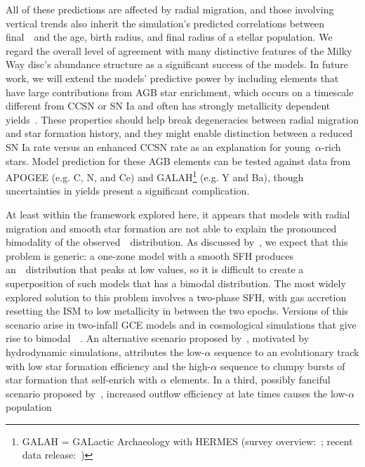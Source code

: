 All of these predictions are affected by radial migration, and those involving 
vertical trends also inherit the simulation's predicted correlations between 
final~\absz~and the age, birth radius, and final radius of a stellar 
population. 
We regard the overall level of agreement with many distinctive features of the 
Milky Way disc's abundance structure as a significant success of the models. 
In future work, we will extend the models' predictive power by including 
elements that have large contributions from AGB star enrichment, which occurs 
on a timescale different from CCSN or SN Ia and often has strongly 
metallicity dependent yields~\citep[e.g.][]{Cristallo2011, Cristallo2015}. 
These properties should help break degeneracies between radial migration and 
star formation history, and they might enable distinction between a reduced 
SN Ia rate versus an enhanced CCSN rate as an explanation for 
young~$\alpha$-rich stars. 
Model prediction for these AGB elements can be tested against data from 
APOGEE (e.g. C, N, and Ce) and GALAH\footnote{
	GALAH = GALactic Archaeology with HERMES 
	(survey overview:~\citealp{Martell2017}; 
	recent data release:~\citealp{Buder2021}) 
} (e.g. Y and Ba), though uncertainties in yields present a significant 
complication.
\par 
At least within the framework explored here, it appears that models 
with radial migration and smooth star formation are not able to explain the 
pronounced bimodality of the observed~\afe~distribution. 
As discussed by~\citet{Vincenzo2021a}, we expect that this problem is generic: 
a one-zone model with a smooth SFH produces an~\afe~distribution that peaks at 
low values, so it is difficult to create a superposition of such models that 
has a bimodal distribution. 
The most widely explored solution to this problem involves a two-phase SFH, 
with gas accretion resetting the ISM to low metallicity in between the two 
epochs. 
Versions of this scenario arise in two-infall GCE models 
\citep[e.g.][]{Chiappini1997, Spitoni2019, Khoperskov2021} and in cosmological 
simulations that give rise to bimodal~\afe~\citep{Mackereth2018, Grand2018, 
Buck2020b}. 
An alternative scenario proposed by~\citet{Clarke2019}, motivated by 
hydrodynamic simulations, attributes the low-$\alpha$ sequence to an 
evolutionary track with low star formation efficiency and the high-$\alpha$ 
sequence to clumpy bursts of star formation that self-enrich with $\alpha$ 
elements. 
In a third, possibly fanciful scenario proposed by~\citet{Weinberg2017b}, 
increased outflow efficiency at late times causes the low-$\alpha$ population 
